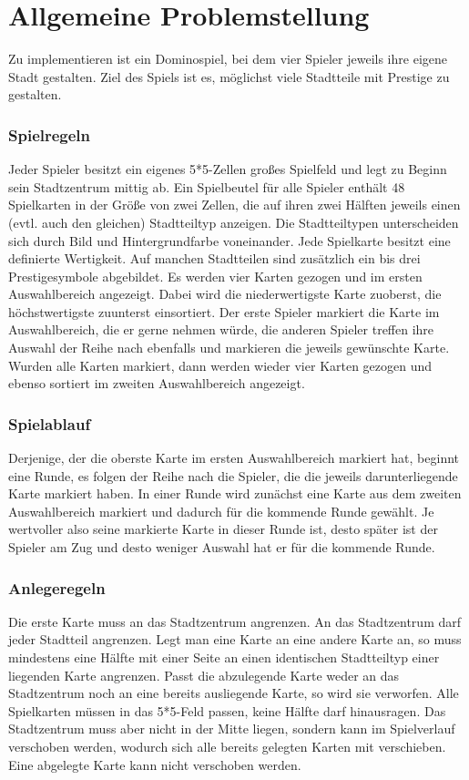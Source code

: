 \part{Allgemeine Problemstellung}
Zu implementieren ist ein Dominospiel, bei dem vier Spieler jeweils ihre eigene Stadt gestalten. Ziel des Spiels ist es, möglichst viele Stadtteile mit Prestige zu gestalten.
\cite{aufgabenstellung}

\section{Spielregeln}
Jeder Spieler besitzt ein eigenes 5*5-Zellen großes Spielfeld und legt zu Beginn sein Stadtzentrum mittig ab.
Ein Spielbeutel für alle Spieler enthält 48 Spielkarten in der Größe von zwei Zellen, die auf ihren zwei Hälften jeweils einen (evtl. auch den gleichen) Stadtteiltyp anzeigen. Die Stadtteiltypen unterscheiden sich durch Bild und Hintergrundfarbe voneinander. Jede Spielkarte besitzt eine definierte Wertigkeit. Auf manchen Stadtteilen sind zusätzlich ein bis drei Prestigesymbole abgebildet.
Es werden vier Karten gezogen und im ersten Auswahlbereich angezeigt. Dabei wird die niederwertigste Karte zuoberst, die höchstwertigste zuunterst einsortiert. Der erste Spieler markiert die Karte im Auswahlbereich, die er gerne nehmen würde, die anderen Spieler treffen ihre Auswahl der Reihe nach ebenfalls und markieren die jeweils gewünschte Karte.
Wurden alle Karten markiert, dann werden wieder vier Karten gezogen und ebenso sortiert im zweiten Auswahlbereich angezeigt.


\section{Spielablauf}
Derjenige, der die oberste Karte im ersten Auswahlbereich markiert hat, beginnt eine Runde, es folgen der Reihe nach die Spieler, die die jeweils darunterliegende Karte markiert haben. In einer Runde wird zunächst eine Karte aus dem zweiten Auswahlbereich markiert und dadurch für die kommende Runde gewählt. Je wertvoller also seine markierte Karte in dieser Runde ist, desto später ist der Spieler am Zug und desto weniger Auswahl hat er für die kommende Runde.


\section{Anlegeregeln}
Die erste Karte muss an das Stadtzentrum angrenzen. An das Stadtzentrum darf jeder Stadtteil angrenzen. Legt man eine Karte an eine andere Karte an, so muss mindestens eine Hälfte mit einer Seite an einen identischen Stadtteiltyp einer liegenden Karte angrenzen.
Passt die abzulegende Karte weder an das Stadtzentrum noch an eine bereits ausliegende Karte, so wird sie verworfen.
Alle Spielkarten müssen in das 5*5-Feld passen, keine Hälfte darf hinausragen. Das Stadtzentrum muss aber nicht in der Mitte liegen, sondern kann im Spielverlauf verschoben werden, wodurch sich alle bereits gelegten Karten mit verschieben.
Eine abgelegte Karte kann nicht verschoben werden.


